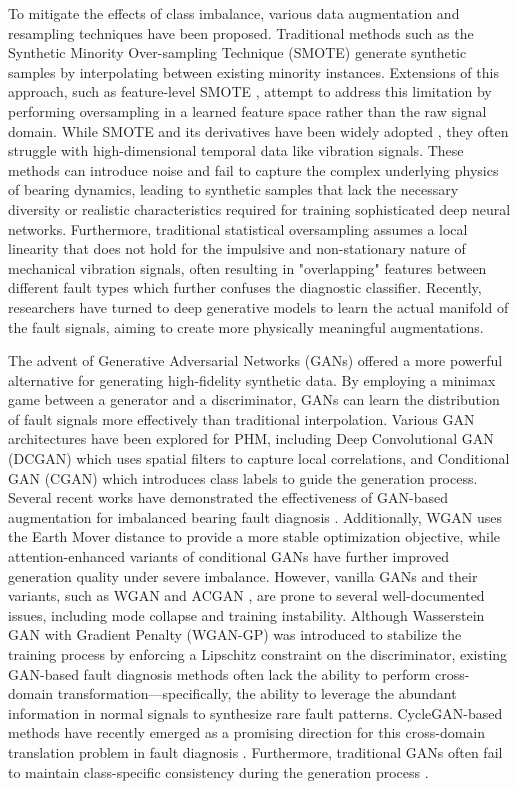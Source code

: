 \documentclass[twocolumn]{IEEEtran}
\begin{document}
To mitigate the effects of class imbalance, various data augmentation and resampling techniques have been proposed. Traditional methods such as the Synthetic Minority Over-sampling Technique (SMOTE) \cite{6} generate synthetic samples by interpolating between existing minority instances. Extensions of this approach, such as feature-level SMOTE \cite{18}, attempt to address this limitation by performing oversampling in a learned feature space rather than the raw signal domain. While SMOTE and its derivatives have been widely adopted \cite{1, 2, 5, 35}, they often struggle with high-dimensional temporal data like vibration signals. These methods can introduce noise and fail to capture the complex underlying physics of bearing dynamics, leading to synthetic samples that lack the necessary diversity or realistic characteristics required for training sophisticated deep neural networks. Furthermore, traditional statistical oversampling assumes a local linearity that does not hold for the impulsive and non-stationary nature of mechanical vibration signals, often resulting in "overlapping" features between different fault types which further confuses the diagnostic classifier. Recently, researchers have turned to deep generative models to learn the actual manifold of the fault signals, aiming to create more physically meaningful augmentations.

The advent of Generative Adversarial Networks (GANs) \cite{1} offered a more powerful alternative for generating high-fidelity synthetic data. By employing a minimax game between a generator and a discriminator, GANs can learn the distribution of fault signals more effectively than traditional interpolation. Various GAN architectures have been explored for PHM, including Deep Convolutional GAN (DCGAN) \cite{14} which uses spatial filters to capture local correlations, and Conditional GAN (CGAN) which introduces class labels to guide the generation process. Several recent works have demonstrated the effectiveness of GAN-based augmentation for imbalanced bearing fault diagnosis \cite{33, 43}. Additionally, WGAN uses the Earth Mover distance to provide a more stable optimization objective, while attention-enhanced variants of conditional GANs \cite{34} have further improved generation quality under severe imbalance. However, vanilla GANs and their variants, such as WGAN \cite{2} and ACGAN \cite{5}, are prone to several well-documented issues, including mode collapse and training instability. Although Wasserstein GAN with Gradient Penalty (WGAN-GP) \cite{3} was introduced to stabilize the training process by enforcing a Lipschitz constraint on the discriminator, existing GAN-based fault diagnosis methods \cite{36, 37} often lack the ability to perform cross-domain transformation—specifically, the ability to leverage the abundant information in normal signals to synthesize rare fault patterns. CycleGAN-based methods have recently emerged as a promising direction for this cross-domain translation problem in fault diagnosis \cite{39}. Furthermore, traditional GANs often fail to maintain class-specific consistency during the generation process \cite{4, 36}.
\end{document}
